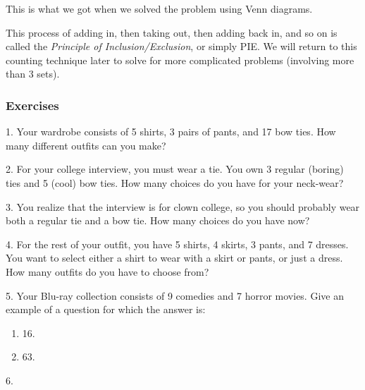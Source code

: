 \documentclass[10pt,]{memoir}
\theoremstyle{plain}
\theoremstyle{definition}
\theoremstyle{definition}
\theoremstyle{definition}
\numberwithin{equation}{chapter}
\begin{document}
This is what we got when we solved the problem using Venn diagrams.
%
\par

This process of adding in, then taking out, then adding back in, and so on is called the \emph{Principle of Inclusion/Exclusion}, or simply PIE. We will return to this counting technique later to solve for more complicated problems (involving more than 3 sets).
%
\typeout{************************************************}
\typeout{************************************************}
\subsubsection[Exercises]{Exercises}\label{exercises-4}
\begin{exerciselist}
\item[1.]\hypertarget{exercise-42}{}
Your wardrobe consists of 5 shirts, 3 pairs of pants, and 17 bow ties. How many different outfits can you make?
%
\par\smallskip
\item[2.]\hypertarget{exercise-43}{}
For your college interview, you must wear a tie. You own 3 regular (boring) ties and 5 (cool) bow ties. How many choices do you have for your neck-wear?
%
\par\smallskip
\item[3.]\hypertarget{exercise-44}{}
You realize that the interview is for clown college, so you should probably wear both a regular tie and a bow tie. How many choices do you have now?
%
\par\smallskip
\item[4.]\hypertarget{exercise-45}{}
For the rest of your outfit, you have 5 shirts, 4 skirts, 3 pants, and 7 dresses. You want to select either a shirt to wear with a skirt or pants, or just a dress. How many outfits do you have to choose from?
%
\par\smallskip
\item[5.]\hypertarget{exercise-46}{}
Your Blu-ray collection consists of 9 comedies and 7 horror movies. Give an example of a question for which the answer is:
%
\leavevmode%
\begin{enumerate}[label=(\alph*)]
\item\hypertarget{li-381}{}
16.
%
\item\hypertarget{li-382}{}
63.
%
\end{enumerate}
\par\smallskip
\item[6.]\hypertarget{exercise-47}{}

\end{exerciselist}
\end{document}
